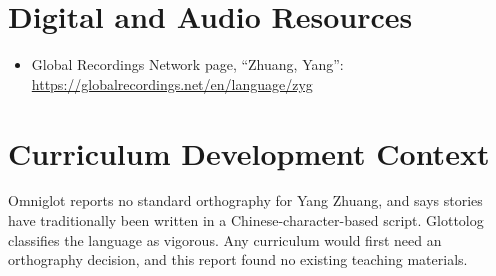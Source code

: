 \documentclass[12pt]{article}
\begin{document}
\section{Digital and Audio Resources}
\begin{itemize}
\item Global Recordings Network page, ``Zhuang, Yang'': \url{https://globalrecordings.net/en/language/zyg}
\end{itemize}

\section{Curriculum Development Context}
Omniglot reports no standard orthography for Yang Zhuang, and says stories have traditionally been written in a Chinese-character-based script. Glottolog classifies the language as vigorous. Any curriculum would first need an orthography decision, and this report found no existing teaching materials.
\end{document}

